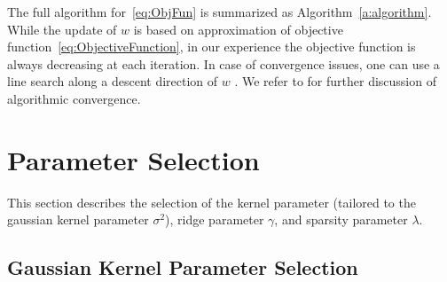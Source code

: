 \documentclass[twoside, onecolumn]{article}
\begin{document}
The full algorithm for~\eqref{eq:ObjFun} is summarized as Algorithm~\ref{a:algorithm}. While the update of $w$ is based on approximation of objective function~\eqref{eq:ObjectiveFunction}, in our experience the objective function is always decreasing at each iteration. In case of convergence issues, one can use a line search along a descent direction of $w$ \cite{allen_automatic_2013}. We refer to \cite{allen_automatic_2013} for further discussion of algorithmic convergence.


\section{Parameter Selection}\label{sec:ParameterSelection}
This section describes the selection of the kernel parameter (tailored to the gaussian kernel parameter $\sigma^2$), ridge parameter $\gamma$, and sparsity parameter $\lambda$.


\subsection{Gaussian Kernel Parameter Selection}\label{sec:KernParameter}



\end{document}
